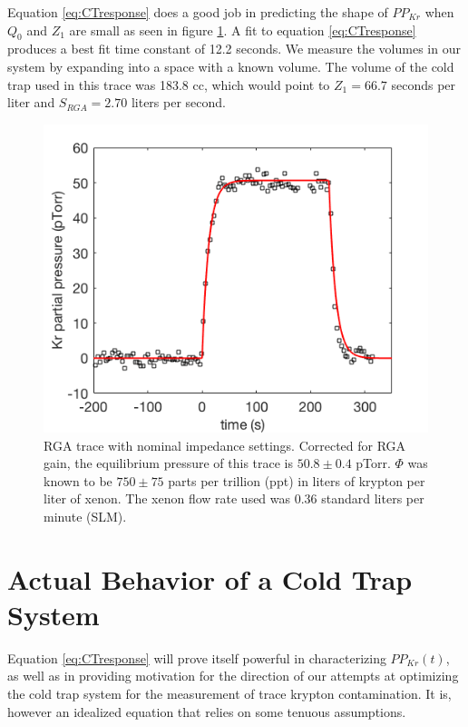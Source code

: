 Equation \ref{eq:CTresponse} does a good job in predicting the shape of $PP_{Kr}$ when $Q_0$ and $Z_1$ are small as seen in figure \ref{fig:RGAtrace_fast}. A fit to equation \ref{eq:CTresponse} produces a best fit time constant of 12.2 seconds. We measure the volumes in our system by expanding into a space with a known volume. The volume of the cold trap used in this trace was 183.8 cc, which would point to $Z_1=66.7$ seconds per liter and $S_{RGA}=2.70$ liters per second. 
\begin{figure}[h!]
\centering
\includegraphics[width=\textwidth]{Figures/RGATrace_fit_fast.png}
\caption{RGA trace with nominal impedance settings. Corrected for RGA gain, the equilibrium pressure of this trace is $50.8 \pm 0.4$ pTorr. $\Phi$ was known to be $750 \pm 75$ parts per trillion (ppt) in liters of krypton per liter of xenon. The xenon flow rate used was 0.36 standard liters per minute (SLM). }
\label{fig:RGAtrace_fast}
\end{figure}





\section{Actual Behavior of a Cold Trap System}\label{sec:actualresponse}
Equation \ref{eq:CTresponse} will prove itself powerful in characterizing $PP_{Kr}(t)$, as well as in providing motivation for the direction of our attempts at optimizing the cold trap system for the measurement of trace krypton contamination. It is, however an idealized equation that relies on some tenuous assumptions. 

